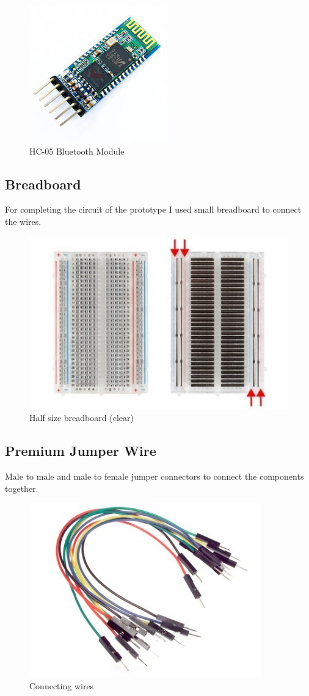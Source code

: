 \documentclass[14pt,a4paper]{extarticle}
\begin{document}
	\begin{figure}[H]
		\includegraphics[center]{hc05.jpg}
		\caption{HC-05 Bluetooth Module}
	\end{figure}

	\subsection{Breadboard}
	
	For completing the circuit of the prototype I used small breadboard to connect the wires. 
	
	\begin{figure}[H]
		\includegraphics[center]{breadboard.jpg}
		\caption{Half size breadboard (clear)}
	\end{figure}
	
	\subsection{Premium Jumper Wire}
	
	Male to male and male to female jumper connectors to connect the components together.
	
	\begin{figure}[H]
		\includegraphics[center]{jumper.jpg}
		\caption{Connecting wires}
	\end{figure}


	
	
\end{document}
